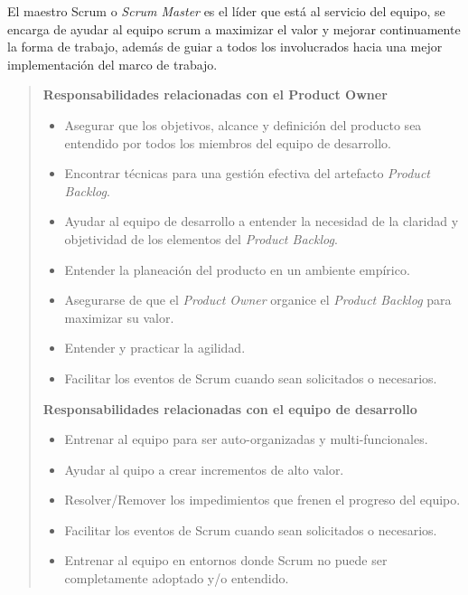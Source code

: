  El maestro Scrum o {\it Scrum Master} es el líder que está al servicio del equipo,
 se encarga de ayudar al equipo scrum a maximizar el valor y mejorar continuamente la
 forma de trabajo, además de guiar a todos los involucrados hacia una mejor implementación
 del marco de trabajo.

    \begin{quote}
        {\bf Responsabilidades relacionadas con el Product Owner }
        \begin{itemize}
        \item Asegurar que los objetivos, alcance y definición del producto sea
              entendido por todos los miembros del equipo de desarrollo.

        \item Encontrar técnicas para una gestión efectiva del artefacto
              {\it Product Backlog}.

        \item Ayudar al equipo de desarrollo a entender la necesidad de la claridad
              y objetividad de los elementos del {\it Product Backlog}.

        \item Entender la planeación del producto en un ambiente empírico.

        \item Asegurarse de que el {\it Product Owner} organice el {\it Product
              Backlog} para maximizar su valor.

        \item Entender y practicar la agilidad.

        \item Facilitar los eventos de Scrum cuando sean solicitados o necesarios.\\
        \end{itemize}

        {\bf Responsabilidades relacionadas con el equipo de desarrollo}
        \begin{itemize}
        \item Entrenar al equipo para ser auto-organizadas y multi-funcionales.
        \item Ayudar al quipo a crear incrementos de alto valor.
        \item Resolver/Remover los impedimientos que frenen el progreso del equipo.
        \item Facilitar los eventos de Scrum cuando sean solicitados o necesarios.
        \item Entrenar al equipo en entornos donde Scrum no puede ser completamente
                adoptado y/o entendido.\\
        \end{itemize}


\end{quote}
